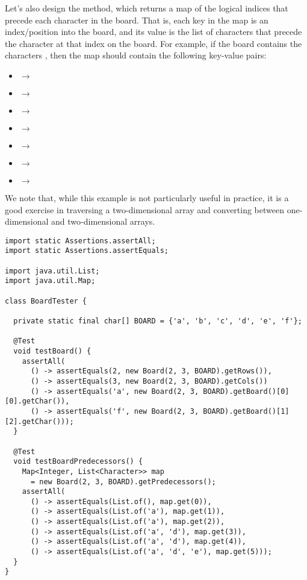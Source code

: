 Let's also design the  method, which returns a map of the logical indices that precede each character in the board.
That is, each key in the map is an index/position into the board, and its value is the list of characters that precede the character at that index on the board.
For example, if the board contains the characters , then the map should contain the following key-value pairs:

\begin{itemize}
  \item {} $\rightarrow$ \ttt{[]}
  \item {} $\rightarrow$ \ttt{[\q{}a\q{}]}
  \item {} $\rightarrow$ \ttt{[\q{}a\q{}]}
  \item {} $\rightarrow$ \ttt{[\q{}a\q{}, \q{}e\q{}]}
  \item {} $\rightarrow$ \ttt{[\q{}a\q{}, \q{}e\q{}]}
  \item {} $\rightarrow$ \ttt{[\q{}a\q{}, \q{}e\q{}, \q{}f\q{}]}
  \item {} $\rightarrow$ \ttt{[\q{}a\q{}, \q{}e\q{}, \q{}f\q{}]}
\end{itemize}

We note that, while this example is not particularly useful in practice, it is a good exercise in traversing a two-dimensional array and converting between one-dimensional and two-dimensional arrays.

\begin{lstlisting}[language=MyJava]
import static Assertions.assertAll;
import static Assertions.assertEquals;

import java.util.List;
import java.util.Map;

class BoardTester {

  private static final char[] BOARD = {'a', 'b', 'c', 'd', 'e', 'f'};

  @Test
  void testBoard() {
    assertAll(
      () -> assertEquals(2, new Board(2, 3, BOARD).getRows()),
      () -> assertEquals(3, new Board(2, 3, BOARD).getCols())
      () -> assertEquals('a', new Board(2, 3, BOARD).getBoard()[0][0].getChar()),
      () -> assertEquals('f', new Board(2, 3, BOARD).getBoard()[1][2].getChar()));
  }

  @Test
  void testBoardPredecessors() {
    Map<Integer, List<Character>> map 
      = new Board(2, 3, BOARD).getPredecessors();
    assertAll(
      () -> assertEquals(List.of(), map.get(0)),
      () -> assertEquals(List.of('a'), map.get(1)),
      () -> assertEquals(List.of('a'), map.get(2)),
      () -> assertEquals(List.of('a', 'd'), map.get(3)),
      () -> assertEquals(List.of('a', 'd'), map.get(4)),
      () -> assertEquals(List.of('a', 'd', 'e'), map.get(5)));
  }
}
\end{lstlisting}

